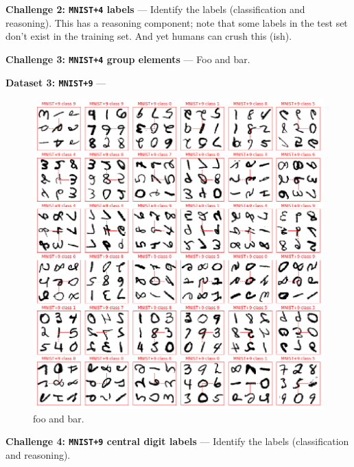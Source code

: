 \documentclass{article}
\renewcommand{\paragraph}[1]{\par\medskip\noindent\textbf{#1} ---}
\begin{document}
\paragraph{Challenge 2: \texttt{MNIST+4} labels}
Identify the labels (classification and reasoning).
This has a reasoning component; note that some labels in the test set don't exist in the training set.
And yet humans can crush this (ish).

\paragraph{Challenge 3: \texttt{MNIST+4} group elements}
Foo and bar.

\paragraph{Dataset 3: \texttt{MNIST+9}}

\begin{figure}[t!]
\includegraphics[width=\textwidth]{../notebooks/MNIST+9.png}
\caption{foo and bar.\label{fig:9}}
\end{figure}

\paragraph{Challenge 4: \texttt{MNIST+9} central digit labels}
Identify the labels (classification and reasoning).
\end{document}
